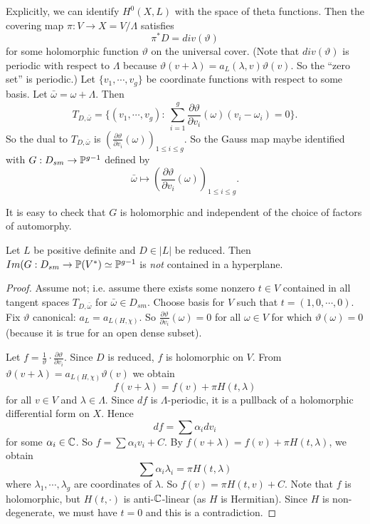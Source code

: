 Explicitly, we can identify $H^0(X,L)$ with the space of theta functions. Then the covering map $\pi:V\to X=V/\Lambda$ satisfies 
\[
\pi^*D=div(\vartheta)
\]
for some holomorphic function $\vartheta$ on the universal cover. (Note that $div(\vartheta)$ is periodic with respect to $\Lambda$ because $\vartheta(v+\lambda)=a_L(\lambda,v)\vartheta(v)$. So the ``zero set'' is periodic.) Let $\{v_1,\cdots,v_g\}$ be coordinate functions with respect to some basis. Let $\bar{\omega}=\omega+\Lambda$. Then 
\[
T_{D,\bar{\omega}}=\{(v_1,\cdots,v_g):\ \sum_{i=1}^g \frac{\partial \vartheta}{\partial v_i}(\omega)(v_i-\omega_i)=0\}.
\]
So the dual to $T_{D,\bar{\omega}}$ is $\left(\frac{\partial \vartheta}{\partial v_i}(\omega)\right)_{1\leq i\leq g}$. So the Gauss map maybe identified with $G:D_{sm}\to {\mathbb P}^{g-1}$ defined by 
\[
\bar{\omega}\mapsto \left(\frac{\partial \vartheta}{\partial v_i}(\omega)\right)_{1\leq i\leq g}.
\]

It is easy to check that $G$ is holomorphic and independent of the choice of factors of automorphy. 

\begin{proposition}
Let $L$ be positive definite and $D\in |L|$ be reduced. Then $Im(G:D_{sm}\to {\mathbb P}(V^*)\simeq {\mathbb P}^{g-1}$ is \emph{not} contained in a hyperplane. 
\end{proposition}

\begin{proof}
Assume not; i.e. assume there exists some nonzero $t\in V$ contained in all tangent spaces $T_{D,\bar{\omega}}$ for $\bar{\omega}\in D_{sm}$. Choose basis for $V$ such that $t=(1,0,\cdots,0)$. Fix $\vartheta$ canonical: $a_L=a_{L(H,\chi)}$. So $\frac{\partial \vartheta}{\partial v_i}(\omega)=0$ for all $\omega\in V$ for which $\vartheta(\omega)=0$ (because it is true for an open dense subset). 

Let $f=\frac{1}{\vartheta}\cdot \frac{\partial \vartheta}{\partial v_i}$. Since $D$ is reduced, $f$ is holomorphic on $V$. From $\vartheta(v+\lambda)=a_{L(H,\chi)} \vartheta(v)$ we obtain 
\[
f(v+\lambda)=f(v)+\pi H(t,\lambda)
\]
for all $v\in V$ and $\lambda\in \Lambda$.
Since $df$ is $\Lambda$-periodic, it is a pullback of a holomorphic differential form on $X$. Hence 
\[
df=\sum \alpha_i dv_i
\]
for some $\alpha_i\in {\mathbb C}$. So $f=\sum \alpha_i v_i+C$. By $f(v+\lambda)=f(v)+\pi H(t,\lambda)$, we obtain
\[
\sum \alpha_i \lambda_i=\pi H(t,\lambda)
\]
where $\lambda_1,\cdots,\lambda_g$ are coordinates of $\lambda$. So $f(v)=\pi H(t,v)+C$. Note that $f$ is holomorphic, but $H(t,\cdot)$ is anti-${\mathbb C}$-linear (as $H$ is Hermitian). Since $H$ is non-degenerate, we must have $t=0$ and this is a contradiction.
\end{proof}

